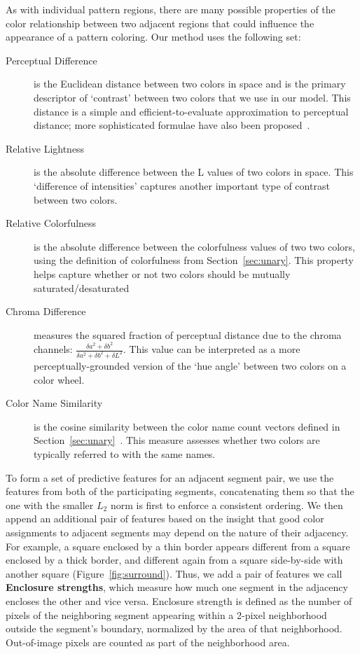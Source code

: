 As with individual pattern regions, there are many possible properties of the color relationship between two adjacent regions that could influence the appearance of a pattern coloring. Our method uses the following set:
\begin{description}
	\item[Perceptual Difference] is the Euclidean distance between two colors in \lab space and is the primary descriptor of `contrast' between two colors that we use in our model. This distance is a simple and efficient-to-evaluate approximation to perceptual distance; more sophisticated formulae have also been proposed~\cite{CIEDE2000}.
	\item[Relative Lightness] is the absolute difference between the L values of two colors in \lab space. This `difference of intensities' captures another important type of contrast between two colors.
	\item[Relative Colorfulness] is the absolute difference between the colorfulness values of two two colors, using the definition of colorfulness from Section~\ref{sec:unary}. This property helps capture whether or not two colors should be mutually saturated/desaturated
	\item[Chroma Difference] measures the squared fraction of perceptual distance due to the \lab chroma channels: $\frac{\delta a^2+\delta b^2}{\delta a^2+\delta b^2+\delta L^2}$. This value can be interpreted as a more perceptually-grounded version of the `hue angle' between two colors on a color wheel.
	\item[Color Name Similarity] is the cosine similarity between the color name count vectors defined in Section~\ref{sec:unary}~\cite{ColorNamingModels}. This measure assesses whether two colors are typically referred to with the same names.
\end{description}
To form a set of predictive features for an adjacent segment pair, we use the features from both of the participating segments, concatenating them so that the one with the smaller $L_2$ norm is first to enforce a consistent ordering. We then append an additional pair of features based on the insight that good color assignments to adjacent segments may depend on the nature of their adjacency. For example, a square enclosed by a thin border appears different from a square enclosed by a thick border, and different again from a square side-by-side with another square (Figure~\ref{fig:surround}). Thus, we add a pair of features we call \textbf{Enclosure strengths}, which measure how much one segment in the adjacency encloses the other and vice versa. Enclosure strength is defined as the number of pixels of the neighboring segment appearing within a 2-pixel neighborhood outside the segment's boundary, normalized by the area of that neighborhood. Out-of-image pixels are counted as part of the neighborhood area.


